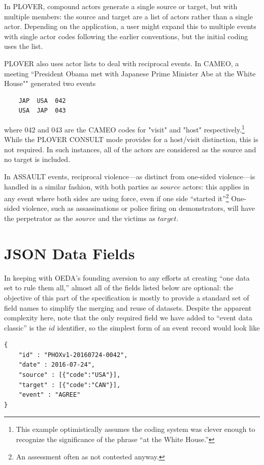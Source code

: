 \documentclass[11pt]{report}
\newcommand{\plcat}[1]{\textsf{#1}}
\begin{document}
In PLOVER, compound actors generate a single source or target, but with multiple members: the source and target are a list of actors rather than a single actor. Depending on the application, a user might expand this to multiple events with single actor codes following the earlier conventions, but the initial coding uses the list.

PLOVER also uses actor lists to deal with reciprocal events. In CAMEO, a meeting ``President Obama met with Japanese Prime Minister Abe at the White House"" generated two events
\begin{verbatim}
    JAP  USA  042
    USA  JAP  043
\end{verbatim}
where 042 and 043 are the CAMEO codes for "visit" and "host" respectively.\footnote{This example optimistically assumes the coding system was clever enough to recognize the significance of the phrase ``at the White House.''} While the PLOVER \plcat{CONSULT} mode provides for a host/visit distinction, this is not required. In such instances, all of the actors are considered as the source and no target is included.

In \plcat{ASSAULT} events, reciprocal violence---as distinct from one-sided violence---is handled in a similar fashion, with both parties as $source$ actors: this applies in any event where both sides are using force, even if one side ``started it''\footnote{An assessment often as not contested anyway.} One-sided violence, such as assassinations or police firing on demonstrators, will have the perpetrator as the $source$ and the victims as $target.$

\chapter{JSON Data Fields}

In keeping with OEDA's founding aversion to any efforts at creating ``one data set to rule them all,'' almost all of the fields listed below are optional: the objective of this part of the specification is mostly to provide a standard set of field names to simplify the merging and reuse of datasets. Despite the apparent complexity here, note that the only required field we have added to ``event data classic'' is the $id$ identifier, so the simplest form of an event record would look like
\begin{verbatim}
{
    "id" : "PHOXv1-20160724-0042",
    "date" : 2016-07-24",
    "source" : [{"code":"USA"}],
    "target" : [{"code":"CAN"}],
    "event" : "AGREE"
}
\end{verbatim}
\end{document}
